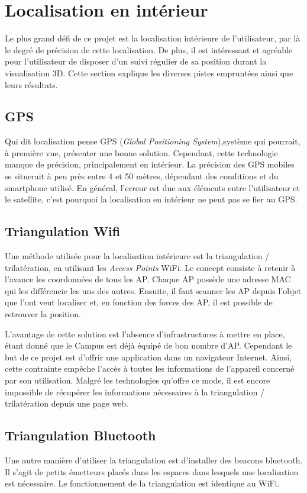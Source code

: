\section{Localisation en intérieur}
\label{sec:localisation}

Le plus grand défi de ce projet est la localisation intérieure de l'utilisateur, par là le degré de précision de cette localisation. De plus, il est intéressant et agréable pour l'utilisateur de disposer d'un suivi régulier de sa position durant la visualisation 3D. Cette section explique les diverses pistes empruntées ainsi que leurs résultats.

\subsection{GPS}
Qui dit localisation pense GPS (\textit{Global Positioning System}),système qui pourrait, à première vue, présenter une bonne solution. Cependant, cette technologie manque de précision, principalement en intérieur. La précision des GPS mobiles se situerait à peu près entre 4 et 50 mètres, dépendant des conditions et du smartphone utilisé. En général, l'erreur est due aux éléments entre l'utilisateur et le satellite, c'est pourquoi la localisation en intérieur ne peut pas se fier au GPS.

\subsection{Triangulation Wifi}
Une méthode utilisée pour la localisation intérieure est la triangulation / trilatération, en utilisant les \textit{Access Points} WiFi. Le concept consiste à retenir à l'avance les coordonnées de tous les AP. Chaque AP possède une adresse MAC qui les différencie les uns des autres. Ensuite, il faut scanner les AP depuis l'objet que l'ont veut localiser et, en fonction des forces des AP, il est possible de retrouver la position.

L'avantage de cette solution est l'absence d'infrastructures à mettre en place, étant donné que le Campus est déjà équipé de bon nombre d'AP. Cependant le but de ce projet est d'offrir une application dans un navigateur Internet. Ainsi, cette contrainte  empêche l'accès à toutes les informations de l'appareil concerné par son utilisation. Malgré les technologies qu'offre ce mode, il est encore impossible de récupérer les informations nécessaires à la triangulation / trilatération depuis une page web.

\subsection{Triangulation Bluetooth}
Une autre manière d'utiliser la triangulation est d'installer des beacons bluetooth. Il s'agit de petits émetteurs placés dans les espaces dans lesquels une localisation est nécessaire. Le fonctionnement de la triangulation est identique au WiFi.


